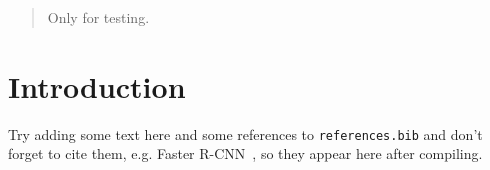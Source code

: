 \documentclass[12pt]{article}
\begin{document}
\maketitle

\begin{abstract}
Only for testing.
\end{abstract}

\section{Introduction}
Try adding some text here and some references to \texttt{references.bib} and don't forget to cite them, e.g. Faster R-CNN~\cite{ren2016faster}, so they appear here after compiling.



\end{document}
